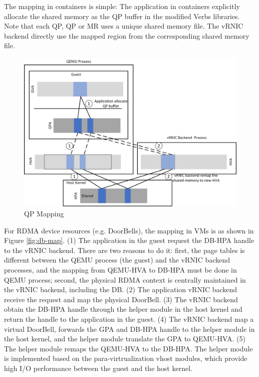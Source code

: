  The mapping in containers is simple: The application in containers explicitly allocate the shared memory as the QP buffer in the modified Verbs libraries. Note that each QP, QP or MR uses a unique shared memory file. The vRNIC backend directly use the mapped region from the corresponding shared memory file.
\begin{figure}[!ht]
	\centering
	\includegraphics[width=1\linewidth]{images/qp-map.png}
	\caption{QP Mapping}
	\label{fig:qp-map}
\end{figure}

 

 For RDMA device resources (e.g. DoorBells), the mapping in VMs is as shown in  Figure \ref{fig:db-map}. (1) The application in the guest request the DB-HPA handle to the vRNIC backend. There are two reasons to do it: first, the page tables is different between the QEMU process (the guest) and the vRNIC backend processes, and the mapping from QEMU-HVA to DB-HPA must be done in QEMU process; second, the physical RDMA context is centrally maintained in the vRNIC backend, including the DB. (2) The application vRNIC backend receive the request and map the physical DoorBell. (3) The vRNIC backend obtain the DB-HPA handle through the helper module in the host kernel and return the handle to the application in the guest. (4) The vRNIC backend map a virtual DoorBell, forwards the GPA and DB-HPA handle to the helper module in the host kernel, and the helper module translate the GPA to QEMU-HVA. (5) The helper module remaps the QEMU-HVA to the DB-HPA. The helper module is implemented based on the para-virtrualization vhost modules, which provide high I/O performance  between the guest and the host kernel.
 
